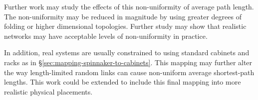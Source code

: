 			Further work may study the effects of this non-uniformity of average path
			length. The non-uniformity may be reduced in magnitude by using greater
			degrees of folding or higher dimensional topologies. Further study may
			show that realistic networks may have acceptable levels of non-uniformity
			in practice.
			
			In addition, real systems are usually constrained to using standard
			cabinets and racks as in \S\ref{sec:mapping-spinnaker-to-cabinets}. This
			mapping may further alter the way length-limited random links can cause
			non-uniform average shortest-path lengths. This work could be extended to
			include this final mapping into more realistic physical placements.
	



